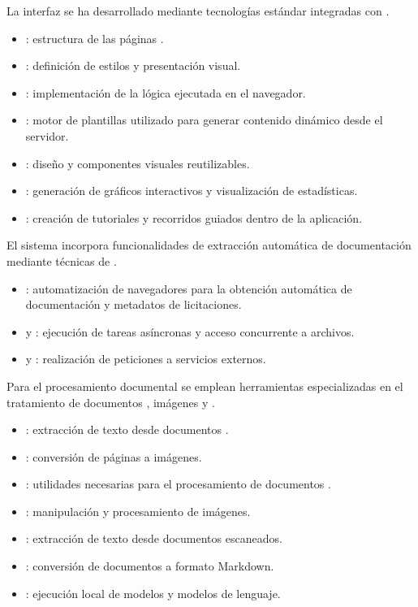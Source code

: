 La interfaz  se ha desarrollado mediante tecnologías estándar integradas con .

\begin{itemize}
\tightlist
	\item {}: estructura de las páginas .
	\item {}: definición de estilos y presentación visual.
	\item {}: implementación de la lógica ejecutada en el navegador.
	\item {}: motor de plantillas utilizado para generar contenido  dinámico desde el servidor.
	\item {}: diseño  y componentes visuales reutilizables.
	\item {}: generación de gráficos interactivos y visualización de estadísticas.
	\item {}: creación de tutoriales y recorridos guiados dentro de la aplicación.
\end{itemize}

El sistema incorpora funcionalidades de extracción automática de documentación mediante técnicas de .

\begin{itemize}
\tightlist
	\item {}: automatización de navegadores  para la obtención automática de documentación y metadatos de licitaciones.
	\item {} y : ejecución de tareas asíncronas y acceso concurrente a archivos.
	\item {} y : realización de peticiones  a servicios externos.
\end{itemize}

Para el procesamiento documental se emplean herramientas especializadas en el tratamiento de documentos , imágenes y .

\begin{itemize}
\tightlist
	\item {}: extracción de texto desde documentos .
	\item {}: conversión de páginas  a imágenes.
	\item {}: utilidades necesarias para el procesamiento de documentos .
	\item {}: manipulación y procesamiento de imágenes.
	\item {}: extracción de texto desde documentos escaneados.
	\item {}: conversión de documentos a formato Markdown.
	\item {}: ejecución local de modelos  y modelos de lenguaje.
\end{itemize}

